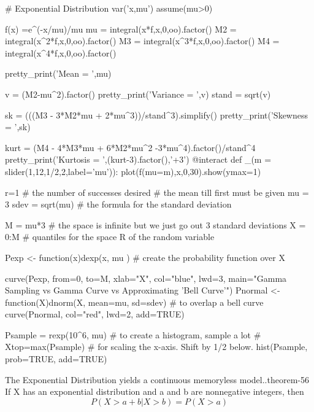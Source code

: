 \documentclass[10pt,]{book}
\numberwithin{equation}{section}
\begin{document}
%
\par
\hypertarget{p-1088}{}%
\leavevmode%
\begin{sageinput}
# Exponential Distribution
var('x,mu')
assume(mu>0)

f(x) =e^(-x/mu)/mu
mu = integral(x*f,x,0,oo).factor()
M2 = integral(x^2*f,x,0,oo).factor()
M3 = integral(x^3*f,x,0,oo).factor()
M4 = integral(x^4*f,x,0,oo).factor()

pretty_print('Mean = ',mu)

v = (M2-mu^2).factor()
pretty_print('Variance = ',v)
stand = sqrt(v)

sk = (((M3 - 3*M2*mu + 2*mu^3))/stand^3).simplify()
pretty_print('Skewness = ',sk)

kurt = (M4 - 4*M3*mu + 6*M2*mu^2 -3*mu^4).factor()/stand^4
pretty_print('Kurtosis = ',(kurt-3).factor(),'+3')
@interact
def _(m = slider(1,12,1/2,2,label='mu')):
    plot(f(mu=m),x,0,30).show(ymax=1)
\end{sageinput}
%
\par
\hypertarget{p-1089}{}%
\leavevmode%
\begin{sageinput}
r=1                # the number of successes desired
            # the mean till first must be given
mu = 3
sdev = sqrt(mu)  # the formula for the standard deviation

M = mu*3   # the space is infinite but we just go out 3 standard deviations
X = 0:M    # quantiles for the space R of the random variable 

Pexp <- function(x){dexp(x, mu )}  # create the probability function over X

curve(Pexp, from=0, to=M, xlab="X", col="blue", lwd=3,
 main="Gamma Sampling vs Gamma Curve vs Approximating 'Bell Curve'") 
Pnormal <- function(X){dnorm(X, mean=mu, sd=sdev)}   # to overlap a bell curve
curve(Pnormal, col="red", lwd=2, add=TRUE) 

Psample = rexp(10^6, mu)  # to create a histogram, sample a lot
# Xtop=max(Psample)          # for scaling the x-axis. Shift by 1/2 below.
hist(Psample, prob=TRUE, add=TRUE)
\end{sageinput}
%
\par
\hypertarget{p-1090}{}%
\begin{theorem}{The Exponential Distribution yields a continuous memoryless model..}{}{theorem-56}%
\hypertarget{p-1091}{}%
If X has an exponential distribution and a and b are nonnegative integers, then%
\begin{equation*}
P( X > a + b | X > b ) = P( X > a)
\end{equation*}
%
\end{theorem}
\end{document}
